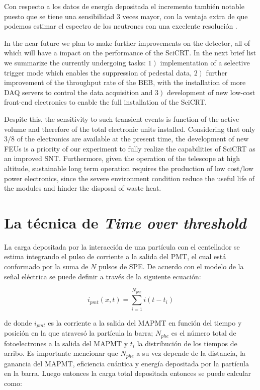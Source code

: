 Con respecto a los datos de energía depositada el incremento también notable puesto que se tiene una sensibilidad $3$ veces mayor, con la ventaja extra de que podemos estimar el espectro de los neutrones con una excelente resolución \cite{ysasai17}.

In the near future we plan to make further improvements on the detector, all of which will have a impact on the performance of the SciCRT. In the next brief list we summarize the currently undergoing tasks: $1\left.\right)$ implementation of a selective trigger mode which enables the suppression of pedestal data, $2\left.\right)$ further improvement of the throughput rate of the BEB, with the installation of more DAQ servers to control the data acquisition and $3\left.\right)$ development of new low-cost front-end electronics to enable the full installation of the SciCRT.

Despite this, the sensitivity to such transient events is function of the active volume and therefore of the total electronic units installed. Considering that only $3/8$ of the electronics are available at the present time, the development of new FEUs is a priority of our experiment to fully realize the capabilities of SciCRT as an improved SNT. Furthermore, given the operation of the telescope at high altitude, sustainable long term operation requires the production of low cost/low power electronics, since the severe environment condition reduce the useful life of the modules and hinder the disposal of waste heat.

\section{La técnica de \emph{Time over threshold}}

La carga depositada por la interacción de una partícula con el centellador se estima integrando el pulso de corriente a la salida del PMT, el cual está conformado por la suma de $N$ pulsos de SPE. De acuerdo con \cite{sanchez10} el modelo de la señal eléctrica se puede definir a través de la siguiente ecuación:

\begin{equation}\label{equ:3.1}
i_{pmt}\left(x,t\right)=\sum_{i=1}^{N_{phe}}i\left(t-t_{i}\right)
\end{equation}

de donde $i_{pmt}$ es la corriente a la salida del MAPMT en función del tiempo y posición en la que atravesó la partícula la barra; $N_{phe}$ es el número total de fotoelectrones a la salida del MAPMT y $t_{i}$ la distribución de los tiempos de arribo. Es importante mencionar que $N_{phe}$ a su vez depende de la distancia, la ganancia del MAPMT, eficiencia cuántica y energía depositada por la partícula en la barra. Luego entonces la carga total depositada entonces se puede calcular como:

